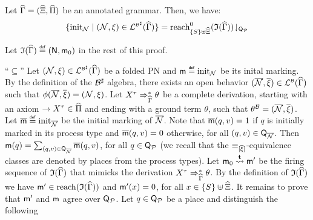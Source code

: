 \begin{lemmaE}[][category=proofs]\label{lemma:initial-markings}
  Let $\widehat{\Gamma}=(\widehat{\Xi},\widehat{\Pi})$ be an
  annotated grammar. Then, we have:
  \begin{align*}
  {\{ {\mathrm{init}_{\mathcal{N}} \mid (\mathcal{N},\xi) \in \mathcal{L}_{}^{\scriptscriptstyle{{\mathcal{B}}^\sharp}}({\widehat{\Gamma}})} \}}
  = {\mathrm{reach}^0_{{\{ {S} \}} \uplus \widehat{\Xi}}({\mathfrak{I}({\widehat{\Gamma}})})}\!\downharpoonleft_{\mathsf{Q}_{\mathcal{P}}}
  \end{align*}
\end{lemmaE}
\begin{proofE}
  Let $\mathfrak{I}({\widehat{\Gamma}}) \stackrel{\scriptscriptstyle{\mathsf{def}}}{=} (\mathsf{N},\mathsf{m}_0)$ in the
  rest of this proof. 
  
  \noindent ``$\subseteq$'' Let $(\mathcal{N},\xi) \in
  \mathcal{L}_{}^{\scriptscriptstyle{{\mathcal{B}}^\sharp}}({\widehat{\Gamma}})$ be a folded PN
  and $\mathsf{m}\stackrel{\scriptscriptstyle{\mathsf{def}}}{=}\mathrm{init}_{\mathcal{N}}$ be its inital marking. By
  the definition of the ${\mathcal{B}}^\sharp$ algebra, there exists an
  open behavior $(\overline{\mathcal{N}},\overline{\xi}) \in
  \mathcal{L}_{}^{\scriptscriptstyle{\mathcal{B}}}({\widehat{\Gamma}})$ such that
  $\phi({\overline{\mathcal{N}},\overline{\xi}}) =
  (\mathcal{N},\xi)$. Let ${X}^{\tau}
  \Rightarrow_{\widehat{\Gamma}}^* \theta$ be a complete derivation,
  starting with an axiom $\rightarrow {X}^{\tau} \in
  \widehat{\Pi}$ and ending with a ground term $\theta$, such that
  $\theta^{\mathcal{B}} = (\overline{\mathcal{N}},\overline{\xi})$.
  Let $\overline{\mathsf{m}} \stackrel{\scriptscriptstyle{\mathsf{def}}}{=} \mathrm{init}_{\overline{\mathcal{N}}}$
  be the initial marking of $\overline{\mathcal{N}}$. Note that
  $\overline{\mathsf{m}}(q,v) = 1$ if $q$ is initially marked in its
  process type and $\overline{\mathsf{m}}(q,v) = 0$ otherwise, for all
  $(q,v) \in \mathsf{Q}_{\overline{\mathcal{N}}}$. Then $\mathsf{m}(q) =
  \sum_{(q,v)\in\mathsf{Q}_{\overline{\mathcal{N}}}}
  \overline{\mathsf{m}}(q,v)$, for all $q \in \mathsf{Q}_{\mathcal{P}}$ (we
  recall that the $\operatorname{{\equiv}}_{[\overline{\xi}]}$-equivalence classes
  are denoted by places from the process types). Let $\mathsf{m}_{0}
  \stackrel{\mathbf{t}}{\leadsto} \mathsf{m}'$ be the firing sequence of
  $\mathfrak{I}({\widehat{\Gamma}})$ that mimicks the derivation
  ${X}^{\tau} \Rightarrow_{\widehat{\Gamma}}^* \theta$. By the
  definition of $\mathfrak{I}({\widehat{\Gamma}})$ we have $\mathsf{m}' \in
  \mathrm{reach}({\mathfrak{I}({\widehat{\Gamma}})})$ and $\mathsf{m}'(x)=0$, for all $x
  \in {\{ {S} \}} \uplus \widehat{\Xi}$. It remains to prove that
  $\mathsf{m}'$ and $\mathsf{m}$ agree over $\mathsf{Q}_{\mathcal{P}}$. Let $q \in
  \mathsf{Q}_{\mathcal{P}}$ be a place and distinguish the following

\end{proofE}
